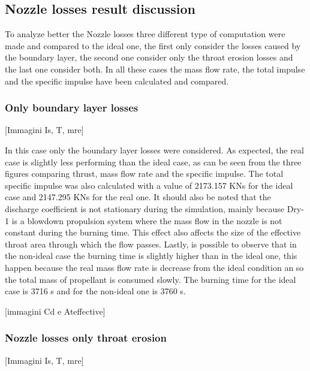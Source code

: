 \subsection{Nozzle losses result discussion}  

To analyze better the Nozzle losses three different type of computation were made and compared to the ideal one, the first only consider the losses caused by the boundary layer, the second one consider only the throat erosion losses and the last one consider both. In all these cases the mass flow rate, the total impulse and the specific impulse have been calculated and compared.  

 

\subsubsection{Only boundary layer losses}  

[Immagini Is, T, mre] 

In this case only the boundary layer losses were considered. As expected, the real case is slightly less performing than the ideal case, as can be seen from the three figures comparing thrust, mass flow rate and the specific impulse. The total specific impulse was also calculated with a value of 2173.157 KNs for the ideal case and 2147.295 KNs for the real one. It should also be noted that the discharge coefficient is not stationary during the simulation, mainly because Dry-1 is a blowdown propulsion system where the mass flow in the nozzle is not constant during the burning time. This effect also affects the size of the effective throat area through which the flow passes. Lastly, is possible to observe that in the non-ideal case the burning time is slightly higher than in the ideal one, this happen because the real mass flow rate is decrease from the ideal condition an so the total mass of propellant is consumed slowly. The burning time for the ideal case is 3716 s and for the non-ideal one is 3760 s.             

[immagini Cd e Ateffective]  
     
\subsubsection{Nozzle losses only throat erosion} 

[Immagini Is, T, mre]      

